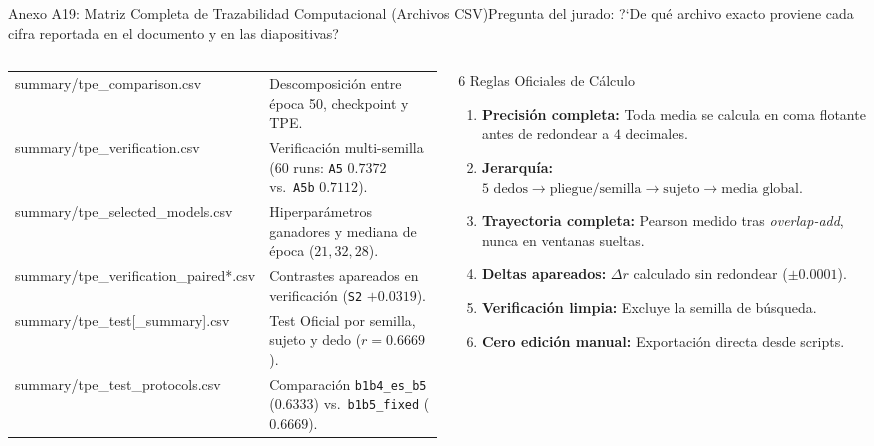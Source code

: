 \begin{frame}{Anexo A19: Matriz Completa de Trazabilidad Computacional (Archivos CSV)}{Pregunta del jurado: ?`De qu\'e archivo exacto proviene cada cifra reportada en el documento y en las diapositivas?}
\begin{columns}[T,onlytextwidth]
\begin{column}{0.60\textwidth}
\begin{tabularx}{\linewidth}{>{\ttfamily\color{ipnDark}}l >{\raggedright\arraybackslash}X}
        summary/tpe\_comparison.csv & Descomposici\'on entre \'epoca 50, checkpoint y TPE. \\
        \rowcolor{rowLight}
        summary/tpe\_verification.csv & Verificaci\'on multi-semilla ($60$ runs: \texttt{A5} $0.7372$ vs.\ \texttt{A5b} $0.7112$). \\
        summary/tpe\_selected\_models.csv & Hiperpar\'ametros ganadores y mediana de \'epoca ($21, 32, 28$). \\
        \rowcolor{rowLight}
        summary/tpe\_verification\_paired*.csv & Contrastes apareados en verificaci\'on (\texttt{S2} $+0.0319$). \\
        summary/tpe\_test[\_summary].csv & Test Oficial por semilla, sujeto y dedo ($r=0.6669$). \\
        \rowcolor{rowLight}
        summary/tpe\_test\_protocols.csv & Comparaci\'on \texttt{b1b4\_es\_b5} ($0.6333$) vs.\ \texttt{b1b5\_fixed} ($0.6669$). \\
        \bottomrule
      \end{tabularx}
    \end{column}

    \begin{column}{0.38\textwidth}
      \begin{block}{6 Reglas Oficiales de C\'alculo}
        \tiny
        \begin{enumerate}\setlength{\itemsep}{1pt}
          \item \textbf{Precisi\'on completa:} Toda media se calcula en coma flotante antes de redondear a $4$ decimales.
          \item \textbf{Jerarqu\'ia:} $5\text{ dedos} \to \text{pliegue/semilla} \to \text{sujeto} \to \text{media global}$.
          \item \textbf{Trayectoria completa:} Pearson medido tras \textit{overlap-add}, nunca en ventanas sueltas.
          \item \textbf{Deltas apareados:} $\Delta r$ calculado sin redondear ($\pm 0.0001$).
          \item \textbf{Verificaci\'on limpia:} Excluye la semilla de b\'usqueda.
          \item \textbf{Cero edici\'on manual:} Exportaci\'on directa desde scripts.
        \end{enumerate}
      \end{block}
      \hfill\hyperlink{anexo:indice_extra}{}
    \end{column}
  \end{columns}
\end{frame}

